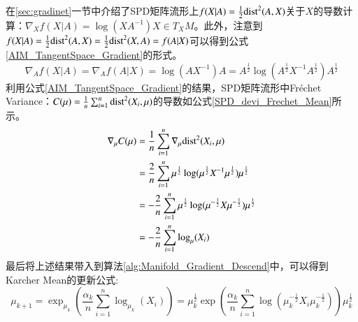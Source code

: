 在\ref{sec:gradinet}一节中介绍了SPD矩阵流形上$f(X|A)=\frac{1}{2}{\rm dist}^{2}(A,X)$关于$X$的导数计算：$\nabla_X f(X|A)=\log(XA^{-1})X \in T_{X}M$。此外，注意到$f(X|A)=\frac{1}{2}{\rm dist}^{2}(A,X)=\frac{1}{2}{\rm dist}^{2}(X,A)=f(A|X)$可以得到公式\ref{AIM_TangentSpace_Gradient}的形式。
\begin{equation}
\label{AIM_TangentSpace_Gradient}
\nabla_A f(X|A)=\nabla_A f(A|X)=\log(AX^{-1})A=A^{\frac{1}{2}}\log(A^{\frac{1}{2}}X^{-1}A^{\frac{1}{2}})A^{\frac{1}{2}}
\end{equation}
利用公式\ref{AIM_TangentSpace_Gradient}的结果，SPD矩阵流形中Fr\'echet Variance：$C(\mu)=\frac{1}{n}\sum_{i=1}^{n}{\rm dist}^{2}(X_{i},\mu)$的导数如公式\ref{SPD_devi_Frechet_Mean}所示。
\begin{equation}
\label{SPD_devi_Frechet_Mean}
\begin{split}
\nabla_{\mu} C(\mu)&=\frac{1}{n}\sum_{i=1}^{n}\nabla_{\mu}{\rm dist}^{2}(X_{i},\mu)\\
&=\frac{2}{n}\sum_{i=1}^{n}{\mu}^{\frac{1}{2}}\log({\mu}^{\frac{1}{2}}X^{-1}{\mu}^{\frac{1}{2}}){\mu}^{\frac{1}{2}}\\
&=-\frac{2}{n}\sum_{i=1}^{n}{\mu}^{\frac{1}{2}}\log({\mu}^{-\frac{1}{2}}X{\mu}^{-\frac{1}{2}}){\mu}^{\frac{1}{2}}\\
&=-\frac{2}{n}\sum_{i=1}^{n}\log_{\mu}(X_{i})
\end{split}
\end{equation}
最后将上述结果带入到算法\ref{alg:Manifold_Gradient_Descend}中，可以得到Karcher Mean的更新公式:
\begin{equation}
\label{AIM_Karcher_Mean}
\mu_{k+1}=\exp_{\mu_{k}}(\frac{\alpha_{k}}{n}\sum_{i=1}^{n}\log_{\mu_{k}}(X_{i}))={\mu}^{\frac{1}{2}}_{k}\exp(\frac{\alpha_{k}}{n}\sum_{i=1}^{n}\log({\mu}^{-\frac{1}{2}}_{k}X_{i}{\mu}^{-\frac{1}{2}}_{k})){\mu}^{\frac{1}{2}}_{k}
\end{equation}

